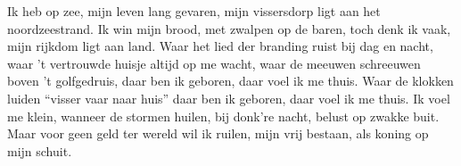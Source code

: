 \beginverse*
Ik heb op zee, mijn leven lang gevaren,
mijn vissersdorp ligt aan het noordzeestrand.
Ik win mijn brood, met zwalpen op de baren,
toch denk ik vaak, mijn rijkdom ligt aan land.
\endverse
\beginchorus
Waar het lied der branding ruist bij dag en nacht,
waar 't vertrouwde huisje altijd op me wacht,
waar de meeuwen schreeuwen boven 't golfgedruis,
daar ben ik geboren, daar voel ik me thuis.
Waar de klokken luiden “visser vaar naar huis”
daar ben ik geboren, daar voel ik me thuis.
\endchorus
\beginverse*
Ik voel me klein, wanneer de stormen huilen,
bij donk’re nacht, belust op zwakke buit.
Maar voor geen geld ter wereld wil ik ruilen,
mijn vrij bestaan, als koning op mijn schuit.
\endverse
\endsong